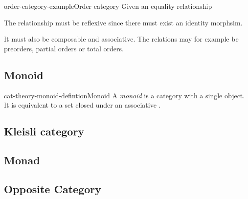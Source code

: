 \documentclass[preview]{standalone}
\begin{document}
\begin{snippetexample}{order-category-example}{Order category}
    Given an equality relationship

    \begin{center}
    \end{center}

    The relationship must be reflexive since there must exist an identity morphsim.

    \begin{center}
    \end{center}

    It must also be composable and associative.
    The relations may for example be preorders, partial orders
    or total orders.
\end{snippetexample}

\subsection{Monoid}

\begin{snippetdefinition}{cat-theory-monoid-defintion}{Monoid}
    A \textit{monoid} is a category with a single object.
    It is equivalent to a set closed under an associative \binoperation.
\end{snippetdefinition}

\subsection{Kleisli category}


\subsection{Monad}


\subsection{Opposite Category}
\end{document}
